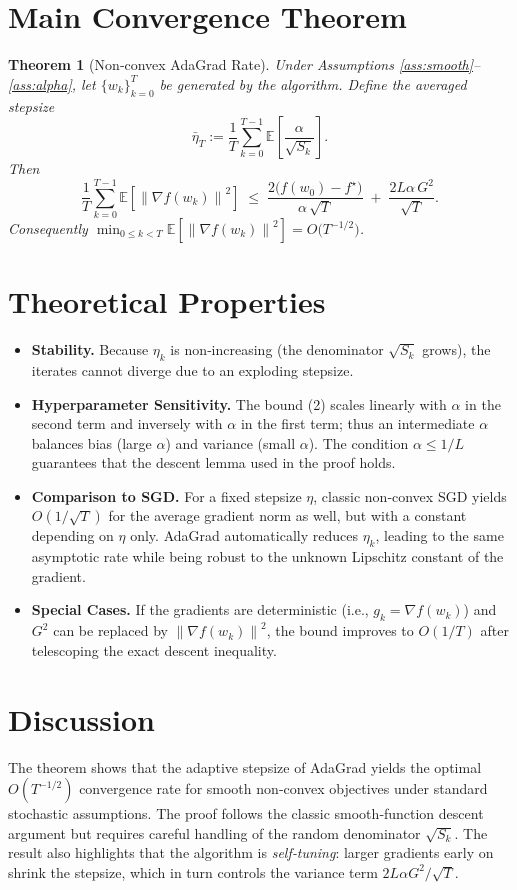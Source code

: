 \documentclass[11pt]{article}
\newtheorem{theorem}{Theorem}
\newcommand{\EE}{\mathbb{E}}
\newcommand{\norm}[1]{\left\|#1\right\|}
\begin{document}
\section*{Main Convergence Theorem}
\begin{theorem}[Non‑convex AdaGrad Rate]\label{thm:rate}
Under Assumptions \ref{ass:smooth}–\ref{ass:alpha}, let $\{w_k\}_{k=0}^{T}$ be generated by the algorithm. Define the averaged stepsize
\[
\bar\eta_T:=\frac{1}{T}\sum_{k=0}^{T-1}\EE\!\left[\frac{\alpha}{\sqrt{S_k}}\right].
\]
Then
\[
\frac{1}{T}\sum_{k=0}^{T-1}\EE\!\left[\norm{\nabla f(w_k)}^2\right]
\;\le\;
\frac{2\bigl(f(w_0)-f^\star\bigr)}{\alpha\,\sqrt{T}}
\;+\;
\frac{2L\alpha\,G^2}{\sqrt{T}} .
\tag{2}
\]
Consequently $\displaystyle\min_{0\le k<T}\EE\!\left[\norm{\nabla f(w_k)}^2\right]=O\!\bigl(T^{-1/2}\bigr)$.
\end{theorem}

\section*{Theoretical Properties}
\begin{itemize}
\item \textbf{Stability.} Because $\eta_k$ is non‑increasing (the denominator $\sqrt{S_k}$ grows), the iterates cannot diverge due to an exploding stepsize.
\item \textbf{Hyperparameter Sensitivity.} The bound (2) scales linearly with $\alpha$ in the second term and inversely with $\alpha$ in the first term; thus an intermediate $\alpha$ balances bias (large $\alpha$) and variance (small $\alpha$). The condition $\alpha\le 1/L$ guarantees that the descent lemma used in the proof holds.
\item \textbf{Comparison to SGD.} For a fixed stepsize $\eta$, classic non‑convex SGD yields $O(1/\sqrt{T})$ for the average gradient norm as well, but with a constant depending on $\eta$ only. AdaGrad automatically reduces $\eta_k$, leading to the same asymptotic rate while being robust to the unknown Lipschitz constant of the gradient.
\item \textbf{Special Cases.} If the gradients are deterministic (i.e., $g_k=\nabla f(w_k)$) and $G^2$ can be replaced by $\norm{\nabla f(w_k)}^2$, the bound improves to $O(1/T)$ after telescoping the exact descent inequality.
\end{itemize}

\section*{Discussion}
The theorem shows that the adaptive stepsize of AdaGrad yields the optimal $O(T^{-1/2})$ convergence rate for smooth non‑convex objectives under standard stochastic assumptions. The proof follows the classic smooth‑function descent argument but requires careful handling of the random denominator $\sqrt{S_k}$. The result also highlights that the algorithm is \emph{self‑tuning}: larger gradients early on shrink the stepsize, which in turn controls the variance term $2L\alpha G^2/\sqrt{T}$.
\end{document}
